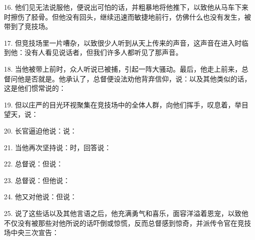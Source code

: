16. 他们见无法说服他，便说出可怕的话，并粗暴地将他推下，以致他从马车下来时擦伤了胫骨。但他没有回头，继续迅速而敏捷地前行，仿佛什么也没有发生，被带到了竞技场。\par

17. 但竞技场里一片嘈杂，以致很少人听到从天上传来的声音，这声音在进入时临到他：没有人看见说话者，但我们许多人都听见了那声音。\par

18. 当他被带上前时，众人听说已被捕，引起一阵大骚动。最后，他走上前来，总督问他是否就是。他承认了，总督便设法劝他背弃信仰，说：以及其他类似的话，这是他们惯常说的：\par

19. 但以庄严的目光环视聚集在竞技场中的全体人群，向他们挥手，叹息着，举目望天，说：\par

20. 长官逼迫他说：说：\par

21. 当他再次坚持说：时，回答说：\par

22. 总督说：但说：\par

23. 总督说：但他说：\par

24. 他又对他说：但说：\par

25. 说了这些话以及其他言语之后，他充满勇气和喜乐，面容洋溢着恩宠，以致他不仅没有被那些对他所说的话吓倒或惊慌，反而总督感到惊奇，并派传令官在竞技场中央三次宣告：\par

